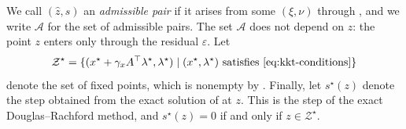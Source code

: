 \documentclass[11pt]{article}
\begin{document}
\begin{definition}\label{def:admissible-pairs}
We call $(\hat z, s)$ an \emph{admissible pair} if it arises from some $(\xi, \nu)$ through , and we write $\mathcal{A}$ for the set of admissible pairs.
The set $\mathcal{A}$ does not depend on $z$: the point $z$ enters only through the residual $\varepsilon$.
Let
\begin{equation*}
    \mathcal{Z}^\star = \{ (x^\star + \gamma_x A^\top\lambda^\star, \lambda^\star) \mid (x^\star,\lambda^\star) \text{ satisfies } \Cref{eq:kkt-conditions} \}
\end{equation*}
denote the set of fixed points, which is nonempty by .
Finally, let $s^\star(z)$ denote the step  obtained from the exact solution of  at $z$.
This is the step of the exact Douglas--Rachford method, and $s^\star(z) = 0$ if and only if $z \in \mathcal{Z}^\star$.
\end{definition}
\end{document}
